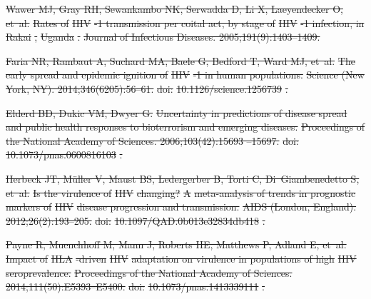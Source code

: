 \documentclass[10pt,letterpaper]{article}
\providecommand{\DIFdeltex}[1]{{\protect\color{red}\sout{#1}}}                      %
\providecommand{\DIFdel}[1]{\texorpdfstring{\DIFdeltex{#1}}{}} %
\begin{document}
\DIFdel{Wawer MJ, Gray RH, Sewankambo NK, Serwadda D, Li X, Laeyendecker O, et~al.
}%
\DIFdel{Rates of }%
\DIFdel{HIV}%
\DIFdel{-1 transmission per coital act, by stage of }%
\DIFdel{HIV}%
\DIFdel{-1
  infection, in }%
\DIFdel{Rakai}%
\DIFdel{, }%
\DIFdel{Uganda}%
\DIFdel{.
}%
\DIFdel{Journal of Infectious Diseases. 2005;191(9):1403--1409.
}%

\DIFdel{Faria NR, Rambaut A, Suchard MA, Baele G, Bedford T, Ward MJ, et~al.
}%
\DIFdel{The early spread and epidemic ignition of }%
\DIFdel{HIV}%
\DIFdel{-1 in human
  populations.
}%
\DIFdel{Science (New York, NY). 2014;346(6205):56--61.
}%
\DIFdel{doi:}%
\DIFdel{10.1126/science.1256739}%
\DIFdel{.
}%

\DIFdel{Elderd BD, Dukic VM, Dwyer G.
}%
\DIFdel{Uncertainty in predictions of disease spread and public health
  responses to bioterrorism and emerging diseases.
}%
\DIFdel{Proceedings of the National Academy of Sciences. 2006;103(42):15693
  --15697.
}%
\DIFdel{doi:}%
\DIFdel{10.1073/pnas.0600816103}%
\DIFdel{.
}%

\DIFdel{Herbeck JT, Müller V, Maust BS, Ledergerber B, Torti C, Di~Giambenedetto S,
  et~al.
}%
\DIFdel{Is the virulence of }%
\DIFdel{HIV}%
\DIFdel{changing? }%
\DIFdel{A}%
\DIFdel{meta-analysis of trends in
  prognostic markers of }%
\DIFdel{HIV}%
\DIFdel{disease progression and transmission.
}%
\DIFdel{AIDS (London, England). 2012;26(2):193--205.
}%
\DIFdel{doi:}%
\DIFdel{10.1097/QAD.0b013e32834db418}%
\DIFdel{.
}%

\DIFdel{Payne R, Muenchhoff M, Mann J, Roberts HE, Matthews P, Adland E, et~al.
}%
\DIFdel{Impact of }%
\DIFdel{HLA}%
\DIFdel{-driven }%
\DIFdel{HIV}%
\DIFdel{adaptation on virulence in populations
  of high }%
\DIFdel{HIV}%
\DIFdel{seroprevalence.
}%
\DIFdel{Proceedings of the National Academy of Sciences.
  2014;111(50):E5393--E5400.
}%
\DIFdel{doi:}%
\DIFdel{10.1073/pnas.1413339111}%
\DIFdel{.
}%
\end{document}

